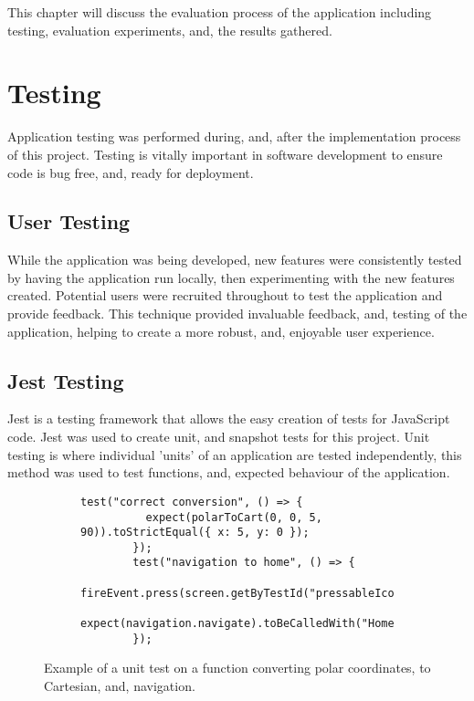 This chapter will discuss the evaluation process of the application including testing, evaluation experiments, and, the results gathered.

\section{Testing}
Application testing was performed during, and, after the implementation process of this project. Testing is vitally important in software development to ensure code is bug free, and, ready for deployment.

\subsection{User Testing}
While the application was being developed, new features were consistently tested by having the application run locally, then experimenting with the new features created. Potential users were recruited throughout to test the application and provide feedback. This technique provided invaluable feedback, and, testing of the application, helping to create a more robust, and, enjoyable user experience.

\subsection{Jest Testing}
Jest is a testing framework that allows the easy creation of tests for JavaScript code. Jest was used to create unit, and snapshot tests for this project. Unit testing is where individual 'units' of an application are tested independently, this method was used to test functions, and, expected behaviour of the application. 

\begin{figure}[!htbp]
    \centering
    \begin{subfigure}[b]{0.8\textwidth}
        \begin{lstlisting}[language=jsJsx]
        test("correct conversion", () => {
          expect(polarToCart(0, 0, 5, 90)).toStrictEqual({ x: 5, y: 0 });
        });
        test("navigation to home", () => {
            fireEvent.press(screen.getByTestId("pressableIcon"));
            expect(navigation.navigate).toBeCalledWith("HomeScreen");
        });
        \end{lstlisting}
    \end{subfigure}
\caption{Example of a unit test on a function converting polar coordinates, to Cartesian, and, navigation.}
\label{fig:jestUnit}
\end{figure}
\FloatBarrier

